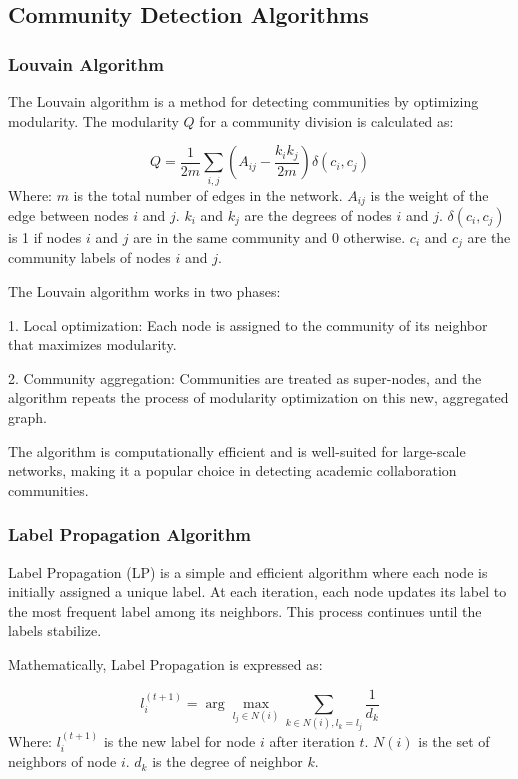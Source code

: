 \documentclass[11pt]{article}
\begin{document}
\subsection{Community Detection Algorithms}

\subsubsection{Louvain Algorithm}
The Louvain algorithm is a method for detecting communities by optimizing modularity. 
The modularity \( Q \) for a community division is calculated as:

\[
Q = \frac{1}{2m} \sum_{i,j} \left( A_{ij} - \frac{k_i k_j}{2m} \right) \delta(c_i, c_j)
\]
Where: 
\( m \) is the total number of edges in the network.
\( A_{ij} \) is the weight of the edge between nodes \( i \) and \( j \).
\( k_i \) and \( k_j \) are the degrees of nodes \( i \) and \( j \).
\( \delta(c_i, c_j) \) is 1 if nodes \( i \) and \( j \) are in the same community and 0 otherwise. 
\( c_i \) and \( c_j \) are the community labels of nodes \( i \) and \( j \).

The Louvain algorithm works in two phases:

1. Local optimization: Each node is assigned to the community of its neighbor that maximizes modularity.

2. Community aggregation: Communities are treated as super-nodes, and the algorithm repeats the process of modularity optimization on this new, aggregated graph.

The algorithm is computationally efficient and is well-suited for large-scale networks, making it a popular choice in detecting academic collaboration communities.

\subsubsection{Label Propagation Algorithm}
Label Propagation (LP) is a simple and efficient algorithm where each node is initially assigned a unique label. At each iteration, each node updates its label to the most frequent label among its neighbors. This process continues until the labels stabilize.

Mathematically, Label Propagation is expressed as:

\[
l_i^{(t+1)} = \arg\max_{l_j \in N(i)} \sum_{k \in N(i), l_k = l_j} \frac{1}{d_k}
\]
Where: 
\( l_i^{(t+1)} \) is the new label for node 
\( i \) after iteration \( t \). \( N(i) \) is the set of neighbors of node \( i \).
\( d_k \) is the degree of neighbor \( k \).
\end{document}
